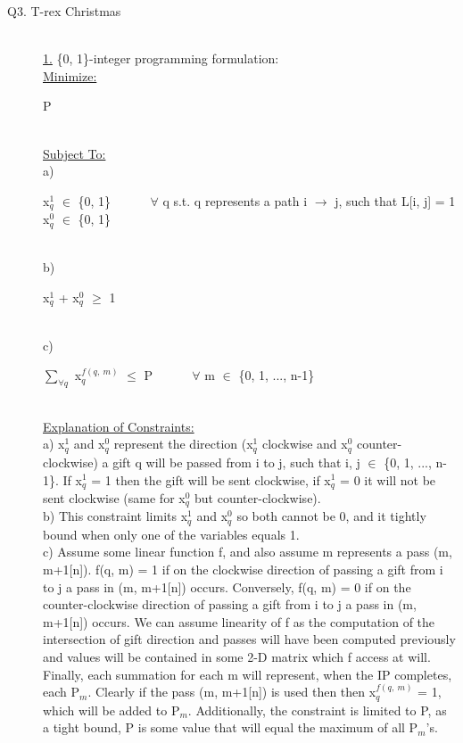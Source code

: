 \documentclass[10pt]{csc_assignment}
\begin{document}
\begin{description}

\newpage
\item[Q3. T-rex Christmas]
~\\
\underline{1.} \{0, 1\}-integer programming formulation:\\
\underline{Minimize:}\\
\hspace*{1cm}\parbox{15cm}{
P
}\\
\underline{Subject To:}\\
a) \\
\hspace*{1cm}\parbox{15cm}{
x$_{q}^1$ $\in$ \{0, 1\} ~~~~~ $\forall$ q s.t. q represents a path i $\rightarrow$ j, such that L[i, j] = 1\\
x$_{q}^0$ $\in$ \{0, 1\} 
}\\
b)\\
\hspace*{1cm}\parbox{15cm}{
x$_{q}^1$ + x$_{q}^0$ $\geqslant$ 1\\
}\\
c)\\
\hspace*{1cm}\parbox{15cm}{
$\sum_{\forall q}$ x$_{q}^{f(q,~ m)}$ $\leqslant$ P ~~~~~ $\forall$ m $\in$ \{0, 1, ..., n-1\}\\
}\\
\underline{Explanation of Constraints:}\\
a) x$_{q}^1$ and x$_{q}^0$ represent the direction (x$_{q}^1$ clockwise and x$_{q}^0$ counter-clockwise) a gift q will be passed from i to j, such that i, j $\in$ \{0, 1, ..., n-1\}. If x$_{q}^1$ = 1 then the gift will be sent clockwise, if x$_{q}^1$ = 0 it will not be sent clockwise (same for x$_{q}^0$ but counter-clockwise).\\
b) This constraint limits x$_{q}^1$ and x$_{q}^0$ so both cannot be 0, and it tightly bound when only one of the variables equals 1.\\
c) Assume some linear function f, and also assume m represents a pass (m, m+1[n]). f(q, m) = 1 if on the clockwise direction of passing a gift from i to j a pass in (m, m+1[n]) occurs. Conversely, f(q, m) = 0 if on the counter-clockwise direction of passing a gift from i to j a pass in (m, m+1[n]) occurs. We can assume linearity of f as the computation of the intersection of gift direction and passes will have been computed previously and values will be contained in some 2-D matrix which f access at will. Finally, each summation for each m will represent, when the IP completes, each P$_{m}$. Clearly if the pass (m, m+1[n]) is used then then x$_{q}^{f(q,~ m)}$ = 1, which will be added to P$_{m}$. Additionally, the constraint is limited to P, as a tight bound, P is some value that will equal the maximum of all P$_{m}$'s.\\ 


\end{description}
\end{document}
